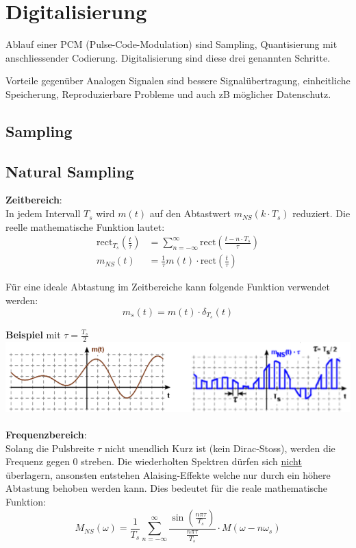 \section{Digitalisierung}
Ablauf einer PCM (Pulse-Code-Modulation) sind Sampling, Quantisierung mit anschliessender Codierung. Digitalisierung sind diese drei genannten Schritte.


Vorteile gegenüber Analogen Signalen sind bessere Signalübertragung, einheitliche Speicherung, Reproduzierbare Probleme und auch zB möglicher Datenschutz.


\subsection{Sampling}
\subsection{Natural Sampling}
\textbf{Zeitbereich}:\\
In jedem Intervall $T_s$ wird $m(t)$ auf den Abtastwert $m_{NS}(k\cdot T_s)$ reduziert. Die reelle mathematische Funktion lautet:
\begin{align*}
	\text{rect}_{T_s}\left(\frac{t}{\tau}\right) &= \sum_{n=-\infty}^{\infty}\text{rect}\left(\frac{t - n\cdot T_s}{\tau}\right) \\
	m_{NS}(t) &= \frac{1}{\tau}m(t)\cdot\text{rect}\left(\frac{t}{\tau}\right)
\end{align*}

Für eine ideale Abtastung im Zeitbereiche kann folgende Funktion verwendet werden:
\[
m_s(t) = m(t)\cdot \delta_{T_s}(t)
\]

\textbf{Beispiel} mit $\tau = \frac{T_s}{2}$\\
\includegraphics[width=\columnwidth]{Images/natural_time}
~\\
\textbf{Frequenzbereich}:\\
Solang die Pulsbreite $\tau$ nicht unendlich Kurz ist (kein Dirac-Stoss), werden die Frequenz gegen 0 streben. Die wiederholten Spektren dürfen sich \underline{nicht} überlagern, ansonsten entstehen Alaising-Effekte welche nur durch ein höhere Abtastung behoben werden kann. Dies bedeutet für die reale mathematische Funktion:
\[
M_{NS}(\omega) = \frac{1}{T_s}\sum_{n=-\infty}^{\infty}\frac{\sin\left(\frac{n\pi\tau}{T_s}\right)}{\frac{n\pi\tau}{T_s}}\cdot M(\omega - n \omega_s)
\]

